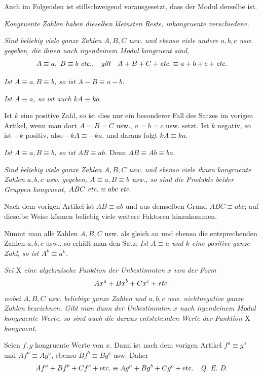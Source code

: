 Auch im Folgenden ist stillschweigend vorausgesetzt, dass der Modul derselbe ist.

\emph{Kongruente Zahlen haben dieselben kleinsten Reste, inkongruente verschiedene.}


\emph{Sind beliebig viele ganze Zahlen $A, B, C$ usw. und ebenso viele andere $a, b, c$ usw. gegeben, die ihnen nach irgendeinem Modul kongruent sind,}
\[
A\equiv a,\ B\equiv b\ \text{\itshape etc.,\quad gilt}\quad A+B+C+\text{\itshape etc.}\equiv a+b+c+\text{\itshape etc.}
\]

\emph{Ist $A\equiv a, B\equiv b$, so ist $A-B\equiv a-b$.}


\emph{Ist $A\equiv a$, so ist auch $kA\equiv ka$.}

Ist $k$ eine positive Zahl, so ist dies nur ein besonderer Fall des Satzes im vorigen Artikel, wenn man dort $A=B=C$ usw., $a=b=c$ usw. setzt. Ist $k$ negativ, so ist $-k$ positiv, also $-kA\equiv -ka$, und daraus folgt $kA\equiv ka$.

\emph{Ist $A\equiv a, B\equiv b$, so ist $AB\equiv ab$.} Denn $AB\equiv Ab\equiv ba$.


\emph{Sind beliebig viele ganze Zahlen $A, B, C$ usw. und ebenso viele ihnen kongruente Zahlen $a, b, c$ usw. gegeben, $A\equiv a, B\equiv b$ usw., so sind die Produkte beider Gruppen kongruent, $ABC\ \text{\itshape etc.}\equiv abc\ \text{\itshape etc.}$}

Nach dem vorigen Artikel ist $AB\equiv ab$ und aus demselben Grund $ABC\equiv abc$; auf dieselbe Weise können beliebig viele weitere Faktoren hinzukommen.

Nimmt man alle Zahlen $A, B, C$ usw. als gleich an und ebenso die entsprechenden Zahlen $a, b, c$ usw., so erhält man den Satz: \emph{Ist $A\equiv a$ und $k$ eine positive ganze Zahl, so ist $A^{k}\equiv a^{k}$.}


\emph{Sei $\mathrm{X}$ eine algebraische Funktion der Unbestimmten $x$ von der Form}
\[
Ax^{a}+Bx^{b}+Cx^{c}+\text{\itshape etc.}
\]
\emph{wobei $A, B, C$ usw. beliebige ganze Zahlen und $a, b, c$ usw. nichtnegative ganze Zahlen bezeichnen. Gibt man dann der Unbestimmten $x$ nach irgendeinem Modul kongruente Werte, so sind auch die daraus entstehenden Werte der Funktion $\mathrm{X}$ kongruent.}

Seien $f, g$ kongruente Werte von $x$. Dann ist nach dem vorigen Artikel $f^{a}\equiv g^{a}$ und $Af^{a}\equiv Ag^{a}$, ebenso $Bf^{b}\equiv Bg^{b}$ usw. Daher
\[
Af^{a}+Bf^{b}+Cf^{c}+\text{etc.}\equiv Ag^{a}+Bg^{b}+Cg^{c}+\text{etc.}\quad\text{\itshape Q. E. D.}
\]

